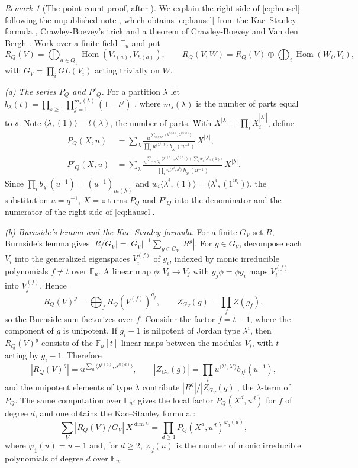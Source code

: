 \documentclass[11pt]{amsart}
\theoremstyle{definition}
\theoremstyle{remark}
\newtheorem{remark}[theorem]{Remark}
\numberwithin{equation}{section}
\newcommand{\F}{\mathbb{F}}
\begin{document}
\begin{remark}[The point-count proof, after \cite{Nak04}]\label{rem:pointcount}
We explain the right side of \eqref{eq:hausel} following the unpublished note \cite[\S1]{Nak04}, which
obtains \eqref{eq:hausel} from the Kac--Stanley formula \cite{Kac,Hua}, Crawley-Boevey's trick \cite{CB}
and a theorem of Crawley-Boevey and Van den Bergh \cite{CBVdB}. Work over a finite field $\F_u$ and put
\[
  R_Q(V)=\bigoplus_{a\in Q_1}\operatorname{Hom}(V_{t(a)},V_{h(a)}),\qquad
  R_Q(V,W)=R_Q(V)\oplus\bigoplus_i\operatorname{Hom}(W_i,V_i),
\]
with $G_V=\prod_iGL(V_i)$ acting trivially on $W$.

\emph{(a) The series $P_Q$ and $P'_Q$.} For a partition $\lambda$ let
$b_\lambda(t)=\prod_{s\ge1}\prod_{j=1}^{m_s(\lambda)}(1-t^j)$ \cite[III,~(2.12)]{Mac}, where
$m_s(\lambda)$ is the number of parts equal to $s$. Note $\langle\lambda,(1)\rangle=l(\lambda)$, the number
of parts. With $X^{|\lambda|}=\prod_iX_i^{|\lambda^i|}$, define
\begin{align*}
  P_Q(X,u)&=\sum_{\lambda}
    \frac{u^{\sum_{a\in Q_1}\langle\lambda^{t(a)},\lambda^{h(a)}\rangle}}
         {\prod_iu^{\langle\lambda^i,\lambda^i\rangle}\,b_{\lambda^i}(u^{-1})}\,X^{|\lambda|},\\
  P'_Q(X,u)&=\sum_{\lambda}
    \frac{u^{\sum_{a\in Q_1}\langle\lambda^{t(a)},\lambda^{h(a)}\rangle+\sum_iw_i\langle\lambda^i,(1)\rangle}}
         {\prod_iu^{\langle\lambda^i,\lambda^i\rangle}\,b_{\lambda^i}(u^{-1})}\,X^{|\lambda|}.
\end{align*}
Since $\prod_ib_{\lambda^i}(u^{-1})=(u^{-1})_{m(\lambda)}$ and $w_i\langle\lambda^i,(1)\rangle=\langle\lambda^i,(1^{w_i})\rangle$,
the substitution $u=q^{-1}$, $X=z$ turns $P_Q$ and $P'_Q$ into the denominator and the numerator of the
right side of \eqref{eq:hausel}.

\emph{(b) Burnside's lemma and the Kac--Stanley formula.} For a finite $G_V$-set $R$, Burnside's lemma
gives $|R/G_V|=|G_V|^{-1}\sum_{g\in G_V}|R^g|$. For $g\in G_V$, decompose each $V_i$ into the generalized
eigenspaces $V_i^{(f)}$ of $g_i$, indexed by monic irreducible polynomials $f\neq t$ over $\F_u$. A linear
map $\phi:V_i\to V_j$ with $g_j\phi=\phi g_i$ maps $V_i^{(f)}$ into $V_j^{(f)}$. Hence
\[
  R_Q(V)^g=\bigoplus_fR_Q(V^{(f)})^{g_f},\qquad Z_{G_V}(g)=\prod_fZ(g_f),
\]
so the Burnside sum factorizes over $f$. Consider the factor $f=t-1$, where the component of $g$ is
unipotent. If $g_i-1$
is nilpotent of Jordan type $\lambda^i$, then $R_Q(V)^g$ consists of the $\F_u[t]$-linear maps between the
modules $V_i$, with $t$ acting by $g_i-1$. Therefore
\[
  |R_Q(V)^g|=u^{\sum_a\langle\lambda^{t(a)},\lambda^{h(a)}\rangle},\qquad
  |Z_{G_V}(g)|=\prod_iu^{\langle\lambda^i,\lambda^i\rangle}b_{\lambda^i}(u^{-1}),
\]
and the unipotent elements of type $\lambda$ contribute $|R^g|/|Z_{G_V}(g)|$, the $\lambda$-term of $P_Q$.
The same
computation over $\F_{u^d}$ gives the local factor $P_Q(X^d,u^d)$ for $f$ of degree $d$, and one obtains
the Kac--Stanley formula \cite[Theorem~4.3]{Hua}:
\[
  \sum_V|R_Q(V)/G_V|\,X^{\dim V}=\prod_{d\ge1}P_Q(X^d,u^d)^{\varphi_d(u)},
\]
where $\varphi_1(u)=u-1$ and, for $d\ge2$, $\varphi_d(u)$ is the number of monic irreducible polynomials
of degree $d$ over $\F_u$.


\end{remark}
\end{document}
